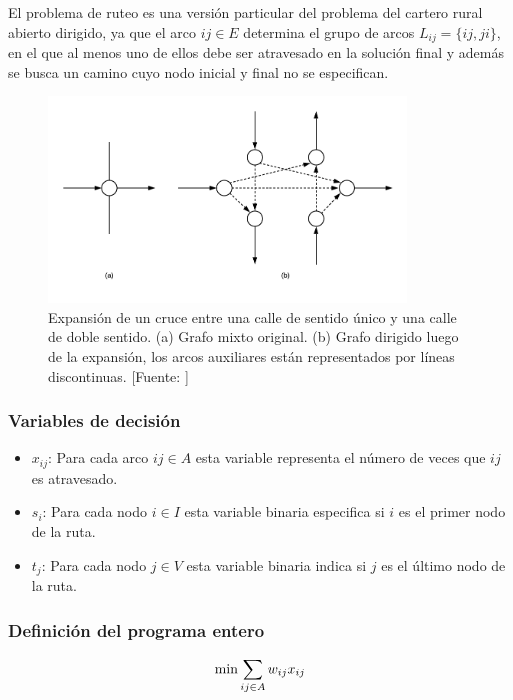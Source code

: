 El problema de ruteo es una versión particular del problema del cartero rural abierto dirigido, ya que el arco $i j \in E $ determina el grupo de arcos $L_{i j} = \{i j, j i\}$, en el que al menos uno de ellos debe ser atravesado en la solución final y además se busca un camino cuyo nodo inicial y final no se especifican.

\begin{figure}[tbp]
\centerline{\includegraphics[width=9.5cm]{expanded_graph.png}}
\caption{Expansión de un cruce entre una calle de sentido único y una calle de doble sentido. (a) Grafo mixto original. (b) Grafo dirigido luego de la expansión, los arcos auxiliares están representados por líneas discontinuas. [Fuente: \citet{Braier2017AnArgentina}]}
\label{fig:grafo_expandido}
\end{figure}

\subsubsection{Variables de decisión}
\begin{itemize}
\item $x_{i j}$: Para cada arco $ {i j} \in A$ esta variable representa el número de veces que $i j$ es atravesado.

\item $s_i$: Para cada nodo $i \in I$ esta variable binaria especifica si  $i$ es el primer nodo de la ruta.

\item $t_j$: Para cada nodo $j \in V$ esta variable binaria indica si $j$ es el último nodo de la ruta.
\end{itemize}

\subsubsection{Definición del programa entero}
\label{sec:programa-entero}
\begin{equation*}
\min \sum_{i j \in A} w_{i j} x_{i j}  \\
\end{equation*} 
\hbox{}

